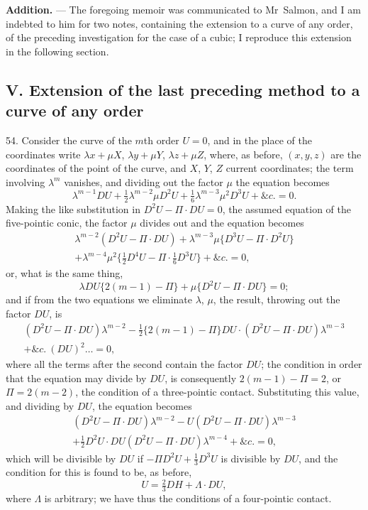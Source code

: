 \documentclass[11pt,a4paper]{article}
\theoremstyle{definition}
\begin{document}
\vspace{6pt}
\noindent\textbf{Addition.} --- The foregoing memoir was communicated to Mr~Salmon, and I am indebted to him for two notes, containing the extension to a curve of any order, of the preceding investigation for the case of a cubic; I reproduce this extension in the following section.

\subsection*{V. Extension of the last preceding method to a curve of any order}

54. Consider the curve of the $m$th order $U=0$, and in the place of the coordinates write $\lambda x+\mu X$, $\lambda y+\mu Y$, $\lambda z+\mu Z$, where, as before, $(x,y,z)$ are the coordinates of the point of the curve, and $X$, $Y$, $Z$ current coordinates; the term involving $\lambda^m$ vanishes, and dividing out the factor $\mu$ the equation becomes
\[
\lambda^{m-1}DU+\tfrac{1}{2}\lambda^{m-2}\mu D^2U+\tfrac{1}{6}\lambda^{m-3}\mu^2D^3U+\&c.=0.
\]
Making the like substitution in $D^2U-\Pi\cdot DU=0$, the assumed equation of the five-pointic conic, the factor $\mu$ divides out and the equation becomes
\begin{multline*}
\lambda^{m-2}(D^2U-\Pi\cdot DU)+\lambda^{m-3}\mu\{D^3U-\Pi\cdot D^2U\}\\
+\lambda^{m-4}\mu^2\{\tfrac{1}{2}D^4U-\Pi\cdot\tfrac{1}{6}D^3U\}+\&c.=0,
\end{multline*}
or, what is the same thing,
\[
\lambda DU\{2(m-1)-\Pi\}+\mu\{D^2U-\Pi\cdot DU\}=0;
\]
and if from the two equations we eliminate $\lambda$, $\mu$, the result, throwing out the factor $DU$, is
\begin{multline*}
(D^2U-\Pi\cdot DU)\lambda^{m-2}-\tfrac{1}{2}\{2(m-1)-\Pi\}DU\cdot(D^2U-\Pi\cdot DU)\lambda^{m-3}\\
+\&c.\ (DU)^2\ldots=0,
\end{multline*}
where all the terms after the second contain the factor $DU$; the condition in order that the equation may divide by $DU$, is consequently $2(m-1)-\Pi=2$, or $\Pi=2(m-2)$, the condition of a three-pointic contact. Substituting this value, and dividing by $DU$, the equation becomes
\begin{multline*}
(D^2U-\Pi\cdot DU)\lambda^{m-2}-U(D^2U-\Pi\cdot DU)\lambda^{m-3}\\
+\tfrac{1}{2}D^2U\cdot DU(D^2U-\Pi\cdot DU)\lambda^{m-4}+\&c.=0,
\end{multline*}
which will be divisible by $DU$ if $-\Pi D^2U+\tfrac{1}{3}D^3U$ is divisible by $DU$, and the condition for this is found to be, as before,
\[
U=\tfrac{2}{3}DH+\Lambda\cdot DU,
\]
where $\Lambda$ is arbitrary; we have thus the conditions of a four-pointic contact.
\end{document}
